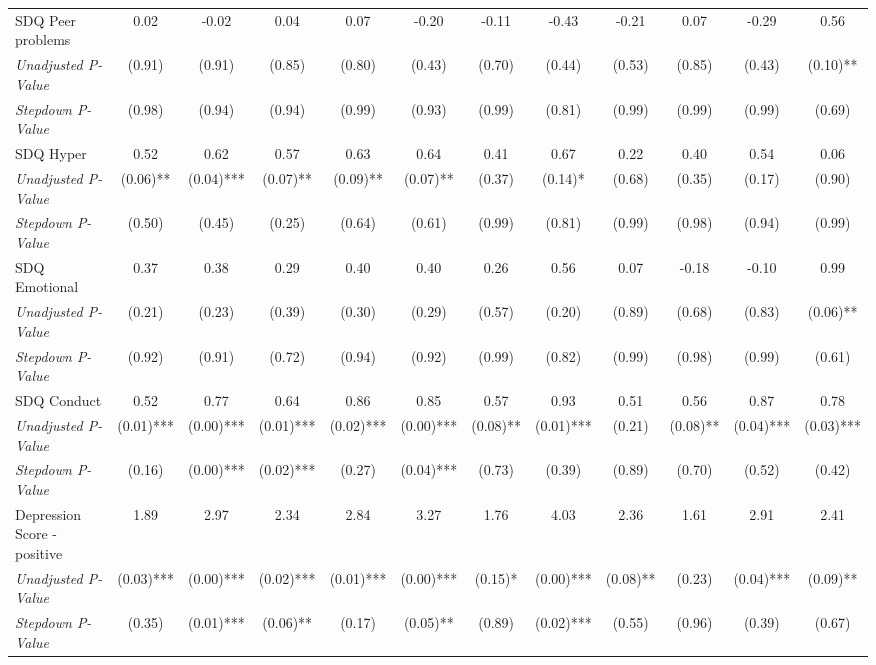 \begin{tabular}{l c c c c c c c c c c c}
SDQ Peer problems & 0.02 & -0.02 & 0.04 & 0.07 & -0.20 & -0.11 & -0.43 & -0.21 & 0.07 & -0.29 & 0.56 \\
\quad \textit{Unadjusted P-Value} & (0.91) & (0.91) & (0.85) & (0.80) & (0.43) & (0.70) & (0.44) & (0.53) & (0.85) & (0.43) & (0.10)** \\
\quad \textit{Stepdown P-Value} & (0.98) & (0.94) & (0.94) & (0.99) & (0.93) & (0.99) & (0.81) & (0.99) & (0.99) & (0.99) & (0.69) \\
SDQ Hyper & 0.52 & 0.62 & 0.57 & 0.63 & 0.64 & 0.41 & 0.67 & 0.22 & 0.40 & 0.54 & 0.06 \\
\quad \textit{Unadjusted P-Value} & (0.06)** & (0.04)*** & (0.07)** & (0.09)** & (0.07)** & (0.37) & (0.14)* & (0.68) & (0.35) & (0.17) & (0.90) \\
\quad \textit{Stepdown P-Value} & (0.50) & (0.45) & (0.25) & (0.64) & (0.61) & (0.99) & (0.81) & (0.99) & (0.98) & (0.94) & (0.99) \\
SDQ Emotional & 0.37 & 0.38 & 0.29 & 0.40 & 0.40 & 0.26 & 0.56 & 0.07 & -0.18 & -0.10 & 0.99 \\
\quad \textit{Unadjusted P-Value} & (0.21) & (0.23) & (0.39) & (0.30) & (0.29) & (0.57) & (0.20) & (0.89) & (0.68) & (0.83) & (0.06)** \\
\quad \textit{Stepdown P-Value} & (0.92) & (0.91) & (0.72) & (0.94) & (0.92) & (0.99) & (0.82) & (0.99) & (0.98) & (0.99) & (0.61) \\
SDQ Conduct & 0.52 & 0.77 & 0.64 & 0.86 & 0.85 & 0.57 & 0.93 & 0.51 & 0.56 & 0.87 & 0.78 \\
\quad \textit{Unadjusted P-Value} & (0.01)*** & (0.00)*** & (0.01)*** & (0.02)*** & (0.00)*** & (0.08)** & (0.01)*** & (0.21) & (0.08)** & (0.04)*** & (0.03)*** \\
\quad \textit{Stepdown P-Value} & (0.16) & (0.00)*** & (0.02)*** & (0.27) & (0.04)*** & (0.73) & (0.39) & (0.89) & (0.70) & (0.52) & (0.42) \\
Depression Score - positive & 1.89 & 2.97 & 2.34 & 2.84 & 3.27 & 1.76 & 4.03 & 2.36 & 1.61 & 2.91 & 2.41 \\
\quad \textit{Unadjusted P-Value} & (0.03)*** & (0.00)*** & (0.02)*** & (0.01)*** & (0.00)*** & (0.15)* & (0.00)*** & (0.08)** & (0.23) & (0.04)*** & (0.09)** \\
\quad \textit{Stepdown P-Value} & (0.35) & (0.01)*** & (0.06)** & (0.17) & (0.05)** & (0.89) & (0.02)*** & (0.55) & (0.96) & (0.39) & (0.67) \\
\bottomrule
\end{tabular}
